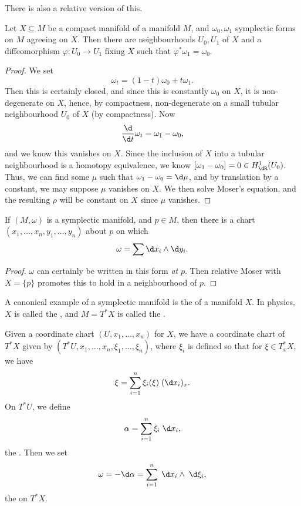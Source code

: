 \documentclass[a4paper]{article}
\begin{document}
There is also a relative version of this.
\begin{thm}
  Let $X \subseteq M$ be a compact manifold of a manifold $M$, and $\omega_0, \omega_1$ symplectic forms on $M$ agreeing on $X$. Then there are neighbourhoods $U_0, U_1$ of $X$ and a diffeomorphism $\varphi: U_0 \to U_1$ fixing $X$ such that $\varphi^* \omega_1 = \omega_0$.
\end{thm}

\begin{proof}
  We set
  \[
    \omega_t = (1 - t) \omega_0 + t \omega_1.
  \]
  Then this is certainly closed, and since this is constantly $\omega_0$ on $X$, it is non-degenerate on $X$, hence, by compactness, non-degenerate on a small tubular neighbourhood $U_0$ of $X$ (by compactness). Now
  \[
    \frac{\d}{\d t} \omega_t = \omega_1 - \omega_0,
  \]
  and we know this vanishes on $X$. Since the inclusion of $X$ into a tubular neighbourhood is a homotopy equivalence, we know $[\omega_1 - \omega_0] = 0 \in H^1_{\dR}(U_0)$. Thus, we can find some $\mu$ such that $\omega_1 - \omega_0 = \d \mu$, and by translation by a constant, we may suppose $\mu$ vanishes on $X$. We then solve Moser's equation, and the resulting $\rho$ will be constant on $X$ since $\mu$ vanishes.
\end{proof}
\begin{thm}
  If $(M, \omega)$ is a symplectic manifold, and $p \in M$, then there is a chart $(x_1, \ldots, x_n, y_1, \ldots, y_n)$ about $p$ on which
  \[
    \omega = \sum \d x_i \wedge \d y_i.
  \]
\end{thm}

\begin{proof}
  $\omega$ can certainly be written in this form \emph{at} $p$. Then relative Moser with $X = \{p\}$ promotes this to hold in a neighbourhood of $p$.
\end{proof}

A canonical example of a symplectic manifold is the  of a manifold $X$. In physics, $X$ is called the , and $M = T^*X$ is called the .

Given a coordinate chart $(U, x_1, \ldots, x_n)$ for $X$, we have a coordinate chart of $T^*X$ given by $(T^* U, x_1, \ldots, x_n, \xi_1, \ldots, \xi_n)$, where $\xi_i$ is defined so that for $\xi \in T^*_xX$, we have
\[
  \xi = \sum_{i = 1}^n \xi_i(\xi) \;(\d x_i)_x.
\]
On $T^* U$, we define
\[
  \alpha = \sum_{i = 1}^n \xi_i \;\d x_i,
\]
the . Then we set
\[
  \omega = - \d \alpha = \sum_{i = 1}^n \;\d x_i \wedge \;\d \xi_i,
\]
the  on $T^* X$.
\end{document}

